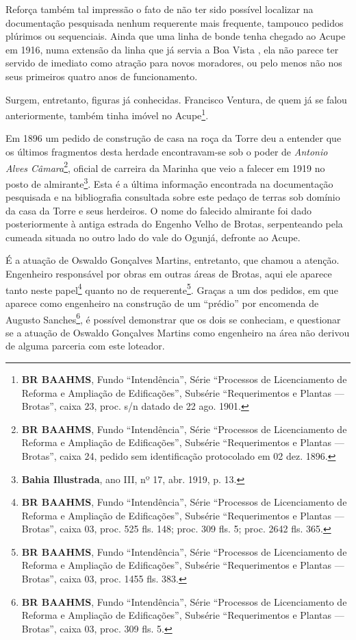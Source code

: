 



Reforça também tal impressão o fato de não ter sido possível localizar na documentação pesquisada nenhum requerente mais frequente, tampouco pedidos plúrimos ou sequenciais. Ainda que uma linha de bonde tenha chegado ao Acupe em 1916, numa extensão da linha que já servia a Boa Vista \cite[p.~384]{stiel_historia_1984}, ela não parece ter servido de imediato como atração para novos moradores, ou pelo menos não nos seus primeiros quatro anos de funcionamento.

Surgem, entretanto, figuras já conhecidas. Francisco Ventura, de quem já se falou anteriormente, também tinha imóvel no Acupe\footnote{\textbf{BR BAAHMS}, Fundo ``Intendência'', Série ``Processos de Licenciamento de Reforma e Ampliação de Edificações'', Subsérie ``Requerimentos e Plantas --- Brotas'', caixa 23, proc. s/n datado de 22 ago. 1901.}. 

Em 1896 um pedido de construção de casa na roça da Torre deu a entender que os últimos fragmentos desta herdade encontravam-se sob o poder de \textit{Antonio Alves Câmara}\footnote{\textbf{BR BAAHMS}, Fundo ``Intendência'', Série ``Processos de Licenciamento de Reforma e Ampliação de Edificações'', Subsérie ``Requerimentos e Plantas --- Brotas'', caixa 24, pedido sem identificação protocolado em 02 dez. 1896.}, oficial de carreira da Marinha que veio a falecer em 1919 no posto de almirante\footnote{\textbf{Bahia Illustrada}, ano III, nº 17, abr. 1919, p. 13.}. Esta é a última informação encontrada na documentação pesquisada e na bibliografia consultada sobre este pedaço de terras sob domínio da casa da Torre e seus herdeiros. O nome do falecido almirante foi dado posteriormente à antiga estrada do Engenho Velho de Brotas, serpenteando pela cumeada situada no outro lado do vale do Ogunjá, defronte ao Acupe.

É a atuação de Oswaldo Gonçalves Martins, entretanto, que chamou a atenção. Engenheiro responsável por obras em outras áreas de Brotas, aqui ele aparece tanto neste papel\footnote{\textbf{BR BAAHMS}, Fundo ``Intendência'', Série ``Processos de Licenciamento de Reforma e Ampliação de Edificações'', Subsérie ``Requerimentos e Plantas --- Brotas'', caixa 03, proc. 525 fls. 148; proc. 309 fls. 5; proc. 2642 fls. 365.} quanto no de requerente\footnote{\textbf{BR BAAHMS}, Fundo ``Intendência'', Série ``Processos de Licenciamento de Reforma e Ampliação de Edificações'', Subsérie ``Requerimentos e Plantas --- Brotas'', caixa 03, proc. 1455 fls. 383.}. Graças a um dos pedidos, em que aparece como engenheiro na construção de um ``prédio'' por encomenda de Augusto Sanches\footnote{\textbf{BR BAAHMS}, Fundo ``Intendência'', Série ``Processos de Licenciamento de Reforma e Ampliação de Edificações'', Subsérie ``Requerimentos e Plantas --- Brotas'', caixa 03, proc. 309 fls. 5.}, é possível demonstrar que os dois se conheciam, e questionar se a atuação de Oswaldo Gonçalves Martins como engenheiro na área não derivou de alguma parceria com este loteador.

